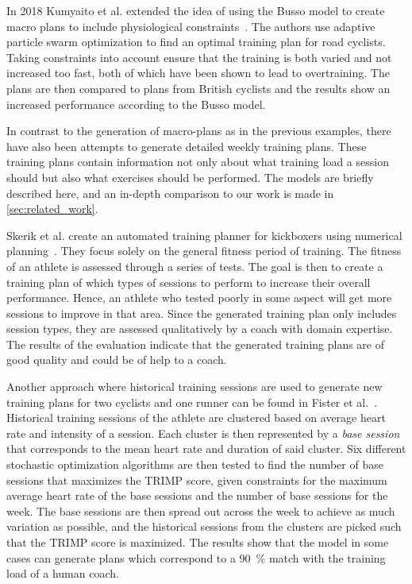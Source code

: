 In 2018 Kumyaito et al. extended the idea of using the Busso model to create macro plans to include physiological constraints~\cite{kumyaito2018planning}. 
The authors use adaptive particle swarm optimization to find an optimal training plan for road cyclists.
Taking constraints into account ensure that the training is both varied and not increased too fast, both of which have been shown to lead to overtraining.
The plans are then compared to plans from British cyclists and the results show an increased performance according to the Busso model.


In contrast to the generation of macro-plans as in the previous examples, there have also been attempts to generate detailed weekly training plans.
These training plans contain information not only about what training load a session should but also what exercises should be performed. 
The models are briefly described here, and an in-depth comparison to our work is made in \cref{sec:related_work}.

Skerik et al. create an automated training planner for kickboxers using numerical planning~\cite{skerik2018automated}. 
They focus solely on the general fitness period of training.
The fitness of an athlete is assessed through a series of tests.
The goal is then to create a training plan of which types of sessions to perform to increase their overall performance.
Hence, an athlete who tested poorly in some aspect will get more sessions to improve in that area.
Since the generated training plan only includes session types, they are assessed qualitatively by a coach with domain expertise.
The results of the evaluation indicate that the generated training plans are of good quality and could be of help to a coach.

Another approach where historical training sessions are used to generate new training plans for two cyclists and one runner can be found in Fister et al.~\cite{fister2019generating}.
Historical training sessions of the athlete are clustered based on average heart rate and intensity of a session.
Each cluster is then represented by a \textit{base session} that corresponds to the mean heart rate and duration of said cluster.
Six different stochastic optimization algorithms are then tested to find the number of base sessions that maximizes the TRIMP score, given constraints for the maximum average heart rate of the base sessions and the number of base sessions for the week.
The base sessions are then spread out across the week to achieve as much variation as possible, and the historical sessions from the clusters are picked such that the TRIMP score is maximized.
The results show that the model in some cases can generate plans which correspond to a \SI{90}{\percent} match with the training load of a human coach.

